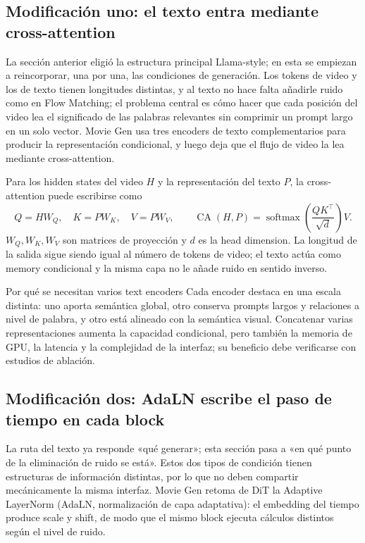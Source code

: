 \subsection{Modificación uno: el texto entra mediante cross-attention}

La sección anterior eligió la estructura principal Llama-style; en esta se empiezan a reincorporar, una por una, las condiciones de generación. Los tokens de video y los de texto tienen longitudes distintas, y al texto no hace falta añadirle ruido como en Flow Matching; el problema central es cómo hacer que cada posición del video lea el significado de las palabras relevantes sin comprimir un prompt largo en un solo vector. Movie Gen usa tres encoders de texto complementarios para producir la representación condicional, y luego deja que el flujo de video la lea mediante cross-attention.


Para los hidden states del video $H$ y la representación del texto $P$, la cross-attention puede escribirse como
\[
Q=HW_Q,\quad K=PW_K,\quad V=PW_V,
\qquad
\operatorname{CA}(H,P)=\operatorname{softmax}\!\left(\frac{QK^\top}{\sqrt d}\right)V.
\]
$W_Q,W_K,W_V$ son matrices de proyección y $d$ es la head dimension. La longitud de la salida sigue siendo igual al número de tokens de video; el texto actúa como memory condicional y la misma capa no le añade ruido en sentido inverso.

\begin{knowledgebox}{Por qué se necesitan varios text encoders}
Cada encoder destaca en una escala distinta: uno aporta semántica global, otro conserva prompts largos y relaciones a nivel de palabra, y otro está alineado con la semántica visual. Concatenar varias representaciones aumenta la capacidad condicional, pero también la memoria de GPU, la latencia y la complejidad de la interfaz; su beneficio debe verificarse con estudios de ablación.
\end{knowledgebox}

\subsection{Modificación dos: AdaLN escribe el paso de tiempo en cada block}

La ruta del texto ya responde «qué generar»; esta sección pasa a «en qué punto de la eliminación de ruido se está». Estos dos tipos de condición tienen estructuras de información distintas, por lo que no deben compartir mecánicamente la misma interfaz. Movie Gen retoma de DiT la Adaptive LayerNorm (AdaLN, normalización de capa adaptativa): el embedding del tiempo produce scale y shift, de modo que el mismo block ejecuta cálculos distintos según el nivel de ruido.

